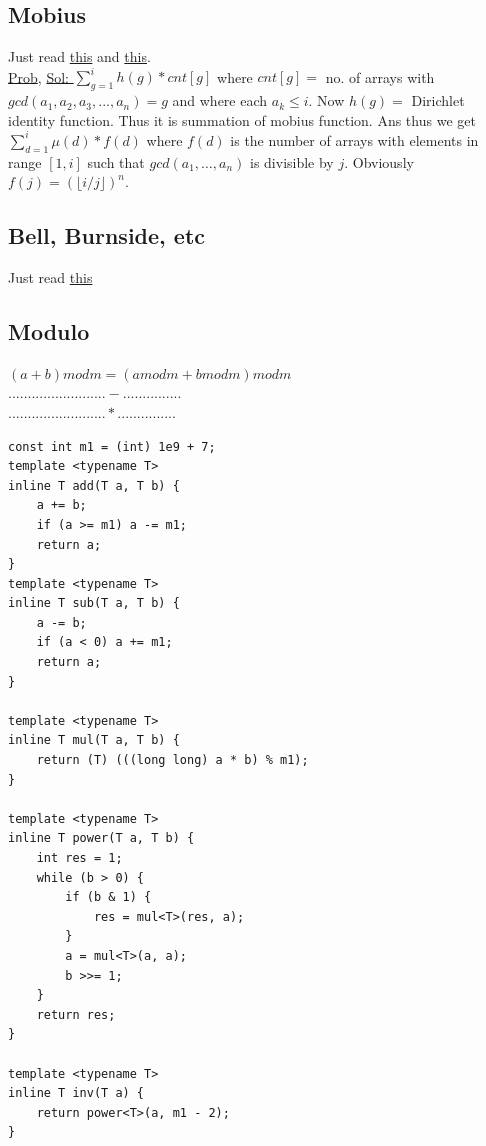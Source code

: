 \documentclass[8pt, a4paper, oneside, twocolumn]{extarticle}
\begin{document}
\subsection{Mobius}
Just read \href{https://github.com/sourabh2311/Competitive-Programming/blob/master/Reference%20Notes/Multiplicative.pdf}{this} and \href{https://www.quora.com/profile/Surya-Kiran/Posts/A-Dance-with-Mobius-Function}{this}.
\\\href{https://codeforces.com/contest/915/problem/G}{Prob}, \href{https://github.com/sourabh2311/Competitive-Programming/blob/master/CF/ER36/G.cpp}{Sol: }$\sum_{g = 1}^{i}h(g)*cnt[g]$ where $cnt[g] = $ no. of arrays with $gcd(a_1, a_2, a_3, ..., a_n) = g$ and where each $a_k \leq i$. Now $h(g) = $ Dirichlet identity function. Thus it is summation of mobius function. Ans thus we get $\sum_{d = 1}^{i}\mu(d)*f(d)$ where $f(d)$ is the number of arrays with elements in range $[1, i]$ such that $gcd(a_1, \dots, a_n)$ is divisible by $j$. Obviously $f(j) = (\lfloor i/j \rfloor)^n$.
\subsection{Bell, Burnside, etc}
Just read \href{https://github.com/sourabh2311/Competitive-Programming/blob/master/Reference%20Notes/cgt.pdf}{this}
\subsection{Modulo}
$(a + b) mod m = (a mod m + b mod m) mod m$\\
$.........................-...............$\\
$.........................*...............$\\
\begin{verbatim}
const int m1 = (int) 1e9 + 7;
template <typename T>
inline T add(T a, T b) {
    a += b;
    if (a >= m1) a -= m1;
    return a;
}
template <typename T>
inline T sub(T a, T b) {
    a -= b;
    if (a < 0) a += m1;
    return a;
}

template <typename T>
inline T mul(T a, T b) {
    return (T) (((long long) a * b) % m1);
}

template <typename T>
inline T power(T a, T b) {
    int res = 1;
    while (b > 0) {
        if (b & 1) {
            res = mul<T>(res, a);
        }
        a = mul<T>(a, a);
        b >>= 1;
    }
    return res;
}

template <typename T>
inline T inv(T a) {
    return power<T>(a, m1 - 2);
}
\end{verbatim}
\end{document}

